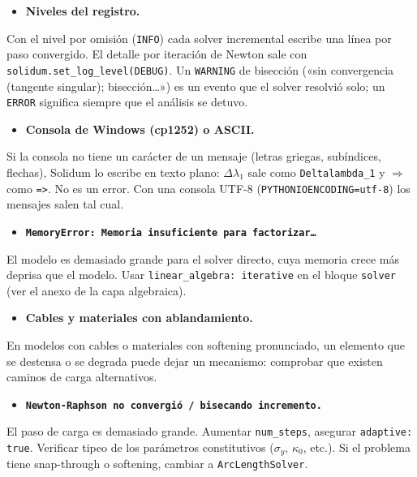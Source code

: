 \documentclass[11pt,oneside]{report}
\begin{document}
\begin{itemize}
  \item \textbf{Niveles del registro.}
\end{itemize}
  Con el nivel por omisión (\texttt{INFO}) cada solver incremental escribe una línea por paso convergido. El detalle por iteración de Newton sale con \texttt{solidum.\allowbreak{}set\_\allowbreak{}log\_\allowbreak{}level(\textquotedbl{}DEBUG\textquotedbl{})}. Un \texttt{WARNING} de bisección («sin convergencia (tangente singular); bisección\ldots{}») es un evento que el solver resolvió solo; un \texttt{ERROR} significa siempre que el análisis se detuvo.

\begin{itemize}
  \item \textbf{Consola de Windows (cp1252) o ASCII.}
\end{itemize}
  Si la consola no tiene un carácter de un mensaje (letras griegas, subíndices, flechas), Solidum lo escribe en texto plano: \texttt{\ensuremath{\Delta}\ensuremath{\lambda}\ensuremath{_{1}}} sale como \texttt{Deltalambda\_1} y \texttt{\ensuremath{\Rightarrow}} como \texttt{=\textgreater{}}. No es un error. Con una consola UTF-8 (\texttt{PYTHONIOENCODING=utf-8}) los mensajes salen tal cual.

\begin{itemize}
  \item \textbf{\texttt{MemoryError: Memoria insuficiente para factorizar\ldots{}}}
\end{itemize}
  El modelo es demasiado grande para el solver directo, cuya memoria crece más deprisa que el modelo. Usar \texttt{linear\_\allowbreak{}algebra: iterative} en el bloque \texttt{solver} (ver el anexo de la capa algebraica).

\begin{itemize}
  \item \textbf{Cables y materiales con ablandamiento.}
\end{itemize}
  En modelos con cables o materiales con softening pronunciado, un elemento que se destensa o se degrada puede dejar un mecanismo: comprobar que existen caminos de carga alternativos.

\begin{itemize}
  \item \textbf{\texttt{Newton-Raphson no convergió /\allowbreak{} bisecando incremento.\allowbreak{}}}
\end{itemize}
  El paso de carga es demasiado grande. Aumentar \texttt{num\_steps}, asegurar \texttt{adaptive: true}. Verificar tipeo de los parámetros constitutivos ($\sigma_y$, $\kappa_0$, etc.). Si el problema tiene snap-through o softening, cambiar a \texttt{ArcLengthSolver}.
\end{document}
